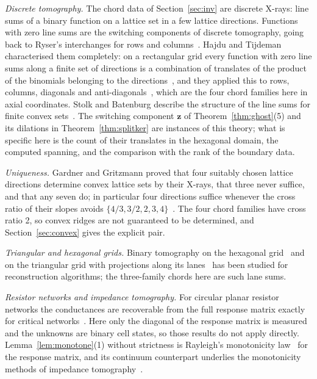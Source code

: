 \documentclass[11pt,a4paper]{article}
\theoremstyle{definition}
\theoremstyle{remark}
\begin{document}
\emph{Discrete tomography.} The chord data of Section~\ref{sec:inv} are discrete X-rays: line sums of a binary function on a lattice set in a few lattice directions. Functions with zero line sums are the switching components of discrete tomography, going back to Ryser's interchanges for rows and columns~\cite{ryser1957}. Hajdu and Tijdeman characterised them completely: on a rectangular grid every function with zero line sums along a finite set of directions is a combination of translates of the product of the binomials belonging to the directions~\cite{hajdu2001}, and they applied this to rows, columns, diagonals and anti-diagonals~\cite{hajdu2001laa}, which are the four chord families here in axial coordinates. Stolk and Batenburg describe the structure of the line sums for finite convex sets~\cite{stolk2010}. The switching component $\mathbf{z}$ of Theorem~\ref{thm:ghost}(5) and its dilations in Theorem~\ref{thm:splitker} are instances of this theory; what is specific here is the count of their translates in the hexagonal domain, the computed spanning, and the comparison with the rank of the boundary data.

\emph{Uniqueness.} Gardner and Gritzmann proved that four suitably chosen lattice directions determine convex lattice sets by their X-rays, that three never suffice, and that any seven do; in particular four directions suffice whenever the cross ratio of their slopes avoids $\{4/3,3/2,2,3,4\}$~\cite{gardner1997}. The four chord families have cross ratio 2, so convex ridges are not guaranteed to be determined, and Section~\ref{sec:convex} gives the explicit pair.

\emph{Triangular and hexagonal grids.} Binary tomography on the hexagonal grid~\cite{matej1998} and on the triangular grid with projections along its lanes~\cite{nagy2016} has been studied for reconstruction algorithms; the three-family chords here are such lane sums.

\emph{Resistor networks and impedance tomography.} For circular planar resistor networks the conductances are recoverable from the full response matrix exactly for critical networks~\cite{curtis1998,colin1996}. Here only the diagonal of the response matrix is measured and the unknowns are binary cell states, so those results do not apply directly. Lemma~\ref{lem:monotone}(1) without strictness is Rayleigh's monotonicity law~\cite{doyle1984} for the response matrix, and its continuum counterpart underlies the monotonicity methods of impedance tomography~\cite{tamburrino2002,harrach2013}.
\end{document}
